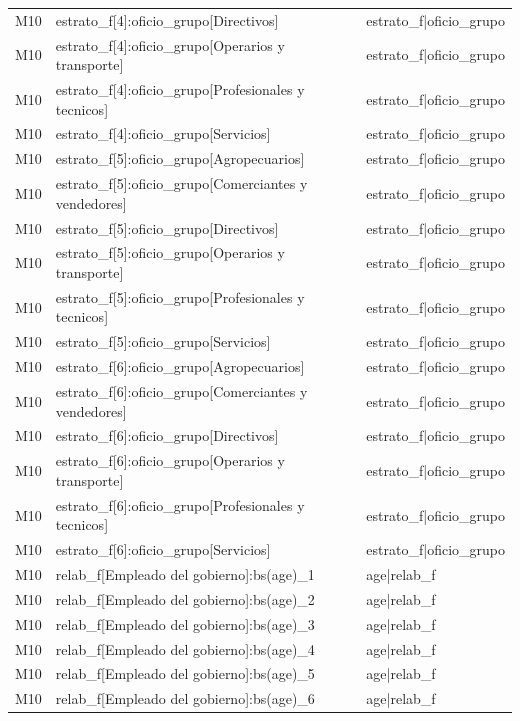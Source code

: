 \begin{longtable}{lll}
M10 & estrato\_f[4]:oficio\_grupo[Directivos] & estrato\_f|oficio\_grupo \\
M10 & estrato\_f[4]:oficio\_grupo[Operarios y transporte] & estrato\_f|oficio\_grupo \\
M10 & estrato\_f[4]:oficio\_grupo[Profesionales y tecnicos] & estrato\_f|oficio\_grupo \\
M10 & estrato\_f[4]:oficio\_grupo[Servicios] & estrato\_f|oficio\_grupo \\
M10 & estrato\_f[5]:oficio\_grupo[Agropecuarios] & estrato\_f|oficio\_grupo \\
M10 & estrato\_f[5]:oficio\_grupo[Comerciantes y vendedores] & estrato\_f|oficio\_grupo \\
M10 & estrato\_f[5]:oficio\_grupo[Directivos] & estrato\_f|oficio\_grupo \\
M10 & estrato\_f[5]:oficio\_grupo[Operarios y transporte] & estrato\_f|oficio\_grupo \\
M10 & estrato\_f[5]:oficio\_grupo[Profesionales y tecnicos] & estrato\_f|oficio\_grupo \\
M10 & estrato\_f[5]:oficio\_grupo[Servicios] & estrato\_f|oficio\_grupo \\
M10 & estrato\_f[6]:oficio\_grupo[Agropecuarios] & estrato\_f|oficio\_grupo \\
M10 & estrato\_f[6]:oficio\_grupo[Comerciantes y vendedores] & estrato\_f|oficio\_grupo \\
M10 & estrato\_f[6]:oficio\_grupo[Directivos] & estrato\_f|oficio\_grupo \\
M10 & estrato\_f[6]:oficio\_grupo[Operarios y transporte] & estrato\_f|oficio\_grupo \\
M10 & estrato\_f[6]:oficio\_grupo[Profesionales y tecnicos] & estrato\_f|oficio\_grupo \\
M10 & estrato\_f[6]:oficio\_grupo[Servicios] & estrato\_f|oficio\_grupo \\
M10 & relab\_f[Empleado del gobierno]:bs(age)\_1 & age|relab\_f \\
M10 & relab\_f[Empleado del gobierno]:bs(age)\_2 & age|relab\_f \\
M10 & relab\_f[Empleado del gobierno]:bs(age)\_3 & age|relab\_f \\
M10 & relab\_f[Empleado del gobierno]:bs(age)\_4 & age|relab\_f \\
M10 & relab\_f[Empleado del gobierno]:bs(age)\_5 & age|relab\_f \\
M10 & relab\_f[Empleado del gobierno]:bs(age)\_6 & age|relab\_f \\

\end{longtable}
